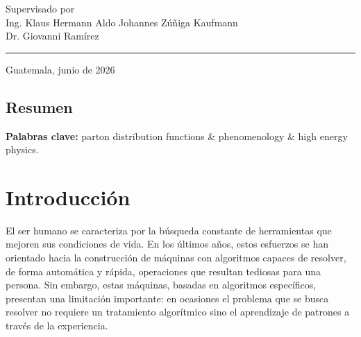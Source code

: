 \documentclass[titlepage,11pt]{report}
\begin{document}
\begin{titlepage}
\begin{center}
    \vfill
    \begin{minipage}[t]{.95\textwidth}
      \centering
      Supervisado por \\%
      Ing. Klaus Hermann Aldo Johannes Zúñiga Kaufmann \\ Dr. Giovanni Ramírez
    \end{minipage}

    \vfill\noindent\rule{\textwidth}{1px}
    \begin{minipage}[t]{.95\textwidth}
      \centering
      Guatemala, junio de 2026
    \end{minipage}
  \end{center}
\end{titlepage}


\pagestyle{empty}
\setcounter{page}{0}

%

\section*{Resumen}
\label{sec:resumen}

\vspace{2em}
\textbf{Palabras clave:} parton distribution functions \& phenomenology \& high energy physics.

\newpage
\pagestyle{plain}

\chapter{Introducción}
\label{sec:introduccion}

El ser humano se caracteriza por la búsqueda constante de herramientas que mejoren sus condiciones de vida. En los últimos años, estos esfuerzos se han orientado hacia la construcción de máquinas con algoritmos capaces de resolver, de forma automática y rápida, operaciones que resultan tediosas para una persona. Sin embargo, estas máquinas, basadas en algoritmos específicos, presentan una limitación importante: en ocasiones el problema que se busca resolver no requiere un tratamiento algorítmico sino el aprendizaje de patrones a través de la experiencia. 
\end{document}
